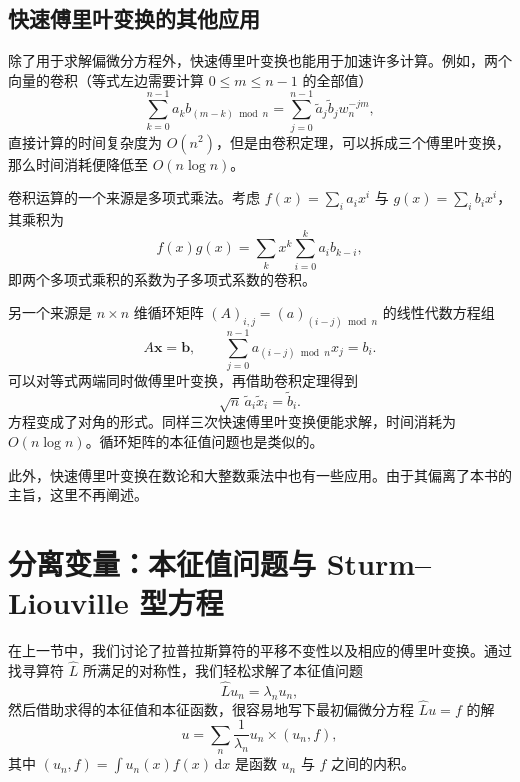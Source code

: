 \subsection{快速傅里叶变换的其他应用}

除了用于求解偏微分方程外，快速傅里叶变换也能用于加速许多计算。例如，两个向量的卷积（等式左边需要计算 $0\le m\le n-1$ 的全部值）
\begin{equation}
\sum_{k=0}^{n-1}a_kb_{(m-k)\bmod n}
=\sum_{j=0}^{n-1}\tilde a_j\tilde b_jw_n^{-jm},
\tag{5.2.36}
\end{equation}
直接计算的时间复杂度为 $O(n^2)$，但是由卷积定理，可以拆成三个傅里叶变换，那么时间消耗便降低至 $O(n\log n)$。

卷积运算的一个来源是多项式乘法。考虑 $f(x)=\sum_i a_ix^i$ 与 $g(x)=\sum_i b_ix^i$，其乘积为
\begin{equation}
f(x)g(x)=\sum_k x^k\sum_{i=0}^k a_i b_{k-i},
\tag{5.2.37}
\end{equation}
即两个多项式乘积的系数为子多项式系数的卷积。


另一个来源是 $n\times n$ 维循环矩阵 $(A)_{i,j}=(a)_{(i-j)\bmod n}$ 的线性代数方程组
\begin{equation}
A\bm x=\bm b,
\qquad
\sum_{j=0}^{n-1}a_{(i-j)\bmod n}x_j=b_i.
\tag{5.2.38}
\end{equation}
可以对等式两端同时做傅里叶变换，再借助卷积定理得到
\begin{equation}
\sqrt n\,\tilde a_i\tilde x_i=\tilde b_i.
\tag{5.2.39}
\end{equation}
方程变成了对角的形式。同样三次快速傅里叶变换便能求解，时间消耗为 $O(n\log n)$。循环矩阵的本征值问题也是类似的。

此外，快速傅里叶变换在数论和大整数乘法中也有一些应用。由于其偏离了本书的主旨，这里不再阐述。

\section{分离变量：本征值问题与 Sturm--Liouville 型方程}

在上一节中，我们讨论了拉普拉斯算符的平移不变性以及相应的傅里叶变换。通过找寻算符 $\hat L$ 所满足的对称性，我们轻松求解了本征值问题
\begin{equation}
\hat L u_n=\lambda_n u_n,
\tag{5.3.1}
\end{equation}
然后借助求得的本征值和本征函数，很容易地写下最初偏微分方程 $\hat L u=f$ 的解
\begin{equation}
u=\sum_n\frac1{\lambda_n}u_n\times(u_n,f),
\tag{5.3.2}
\end{equation}
其中 $(u_n,f)=\int u_n(x)f(x)\,\mathrm dx$ 是函数 $u_n$ 与 $f$ 之间的内积。

